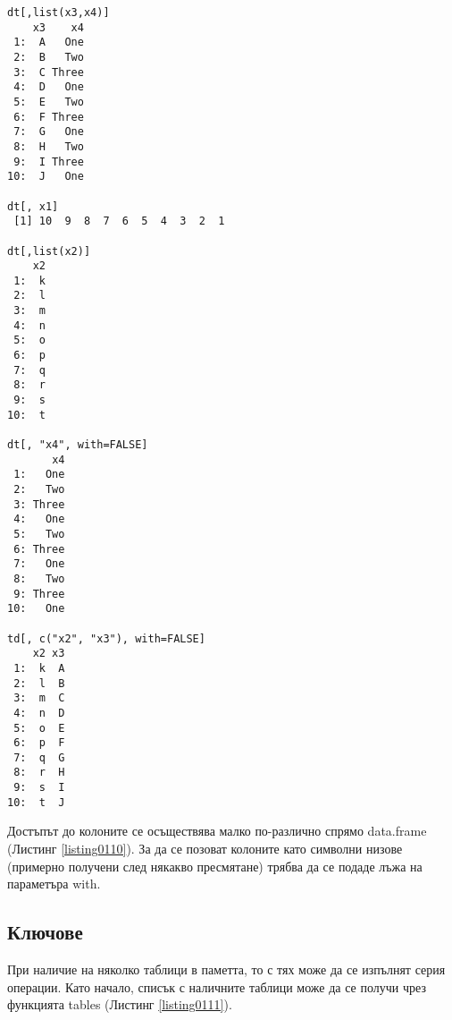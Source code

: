 \begin{lstlisting}[caption=Достъп до колоните, label=listing0110]
dt[,list(x3,x4)]
    x3    x4
 1:  A   One
 2:  B   Two
 3:  C Three
 4:  D   One
 5:  E   Two
 6:  F Three
 7:  G   One
 8:  H   Two
 9:  I Three
10:  J   One

dt[, x1]
 [1] 10  9  8  7  6  5  4  3  2  1

dt[,list(x2)]
    x2
 1:  k
 2:  l
 3:  m
 4:  n
 5:  o
 6:  p
 7:  q
 8:  r
 9:  s
10:  t

dt[, "x4", with=FALSE]
       x4
 1:   One
 2:   Two
 3: Three
 4:   One
 5:   Two
 6: Three
 7:   One
 8:   Two
 9: Three
10:   One

td[, c("x2", "x3"), with=FALSE]
    x2 x3
 1:  k  A
 2:  l  B
 3:  m  C
 4:  n  D
 5:  o  E
 6:  p  F
 7:  q  G
 8:  r  H
 9:  s  I
10:  t  J
\end{lstlisting}

Достъпът до колоните се осъществява малко по-различно спрямо data.frame (Листинг \ref{listing0110}). За да се позоват колоните като символни низове (примерно получени след някакво пресмятане) трябва да се подаде лъжа на параметъра with. 

\subsection{Ключове}

При наличие на няколко таблици в паметта, то с тях може да се изпълнят серия операции. Като начало, списък с наличните таблици може да се получи чрез функцията tables (Листинг \ref{listing0111}).

